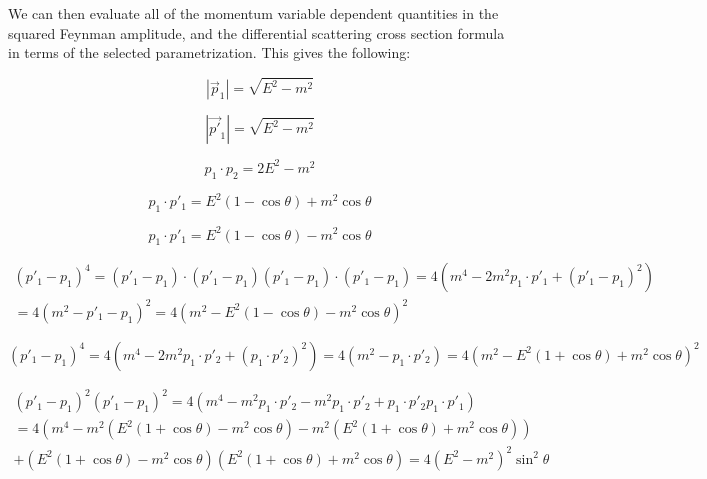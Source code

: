\documentclass[a4]{article}
\begin{document}
    We can then evaluate all of the momentum variable dependent quantities in the squared Feynman amplitude, and the differential scattering cross section formula in terms of the selected parametrization. This gives the following:

    \begin{equation}
        |\vec{p}_1| = \sqrt{E^2 - m^2}
    \end{equation}

    \begin{equation}
        |\vec{p'}_1| = \sqrt{E^2 - m^2}
    \end{equation}

    \begin{equation}
        p_1 \cdot p_2 = 2 E^2 - m^2
    \end{equation}

    \begin{equation}
        p_1 \cdot p'_1 = E^2 (1 - \cos \theta) + m^2 \cos \theta
    \end{equation}

    \begin{equation}
        p_1 \cdot p'_1 = E^2 (1 - \cos \theta) - m^2 \cos \theta
    \end{equation}

    \begin{eqnarray}
        (p'_1 - p_1)^4 = (p'_1 - p_1) \cdot (p'_1 - p_1) (p'_1 - p_1) \cdot (p'_1 - p_1) = 4 (m^4 - 2 m^2 p_1 \cdot p'_1 + (p'_1 - p_1)^2) \\
        = 4 (m^2 - p'_1 - p_1)^2 = 4 (m^2 - E^2 (1 - \cos \theta) - m^2 \cos \theta)^2
    \end{eqnarray}

    \begin{equation}
        (p'_1 - p_1)^4 = 4 (m^4 - 2 m^2 p_1 \cdot p'_2 + (p_1 \cdot p'_2)^2) = 4 (m^2 - p_1 \cdot p'_2) = 4 (m^2 - E^2 (1 + \cos \theta) + m^2 \cos \theta)^2
    \end{equation}

    \begin{eqnarray}
        (p'_1 - p_1)^2 (p'_1 - p_1)^2 = 4 (m^4 - m^2 p_1 \cdot p'_2 - m^2 p_1 \cdot p'_2 + p_1 \cdot p'_2 p_1 \cdot p'_1) \\
        = 4 (m^4 - m^2 (E^2 (1 + \cos \theta) - m^2 \cos \theta) - m^2 (E^2 (1 + \cos \theta) + m^2 \cos \theta) ) \\
        + (E^2 (1 + \cos \theta) - m^2 \cos \theta) (E^2 (1 + \cos \theta) + m^2 \cos \theta) = 4 (E^2 - m^2)^2 \sin^2 \theta 
    \end{eqnarray}
\end{document}
